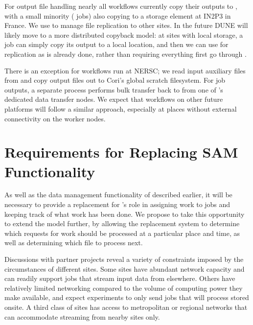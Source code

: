 \documentclass[../main-v1.tex]{subfiles}
\begin{document}
For output file handling nearly all workflows currently copy their outputs to  , with a small minority ( jobs) also copying to a storage element at IN2P3 in France. We use  to manage file replication
to other sites. In the future DUNE will likely move to a more distributed copyback model: at sites with local storage, a job can simply copy its output to a local location, and then we can use  for replication as is already done, rather than requiring everything first go through .

There is an exception for workflows run at NERSC; we read input auxiliary files from and copy output files out
to Cori's global scratch filesystem. For job outputs, a separate process performs bulk transfer back to  from one of 's dedicated data transfer nodes. We expect that workflows on other future  platforms
will follow a similar approach, especially at places without external connectivity on the worker nodes.

\section{Requirements for Replacing SAM Functionality}

As well as the data management functionality of  described earlier, it will be necessary to provide a replacement for 's role in assigning work to jobs and keeping track of what work has been done. We propose to take this opportunity to extend the  model further, by allowing the replacement system to determine which requests for work should be processed at a particular place and time, as well as determining which file to process next.

Discussions with partner projects reveal a variety of constraints imposed by the circumstances of different sites. Some sites have 
abundant network capacity and can readily support jobs that stream input data from elsewhere. Others have relatively limited networking
compared to the volume of computing power they make available, and
expect experiments to only send jobs that will process %
stored onsite. A third class of sites has access to metropolitan or 
regional networks that can accommodate streaming from nearby sites only.
\end{document}
